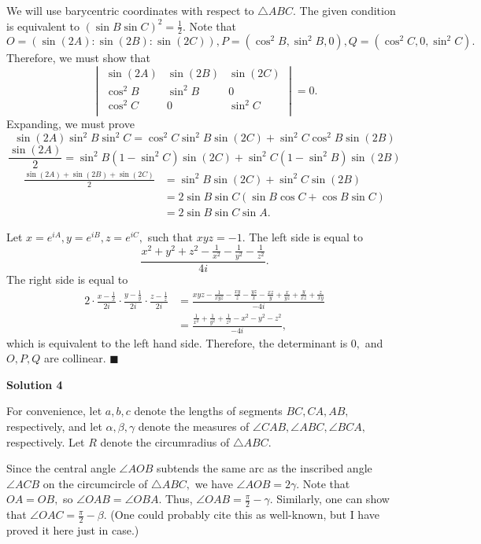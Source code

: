 \begin{enumerate}
We will use barycentric coordinates with respect to $\triangle ABC.$ The given condition is equivalent to $(\sin B\sin C)^2=\frac{1}{2}.$ Note that 
 \[O=(\sin(2A):\sin(2B):\sin(2C)), P=(\cos^2B,\sin^2B,0), Q=(\cos^2C,0,\sin^2C).\] Therefore, we must show that 
 \[\begin{vmatrix} \sin(2A) & \sin(2B) & \sin(2C) \\  \cos^2B & \sin^2B & 0 \\  \cos^2C & 0 & \sin^2C \\  \end{vmatrix}=0.\] Expanding, we must prove 
 \[\sin(2A)\sin^2B\sin^2C=\cos^2C\sin^2B\sin(2C)+\sin^2C\cos^2B\sin(2B)\] 
 \[\frac{\sin(2A)}{2}=\sin^2B(1-\sin^2C)\sin(2C)+\sin^2C(1-\sin^2B)\sin(2B)\] 
 \begin{align*} \frac{\sin(2A)+\sin(2B)+\sin(2C)}{2}&=\sin^2B\sin(2C)+\sin^2C\sin(2B)\\ &=2\sin B\sin C(\sin B\cos C+\cos B\sin C) \\ &=2\sin B\sin C\sin A.\end{align*}


 Let $x=e^{iA}, y=e^{iB}, z=e^{iC},$ such that $xyz=-1.$ The left side is equal to 
 \[\frac{x^2+y^2+z^2-\frac{1}{x^2}-\frac{1}{y^2}-\frac{1}{z^2}}{4i}.\] The right side is equal to 
 \begin{align*} 2\cdot \frac{x-\frac{1}{x}}{2i}\cdot \frac{y-\frac{1}{y}}{2i}\cdot \frac{z-\frac{1}{z}}{2i}&=\frac{xyz-\frac{1}{xyz}-\frac{xy}{z}-\frac{yz}{x}-\frac{xz}{y}+\frac{x}{yz}+\frac{y}{xz}+\frac{z}{xy}}{-4i}\\ &=\frac{\frac{1}{x^2}+\frac{1}{y^2}+\frac{1}{z^2}-x^2-y^2-z^2}{-4i},\end{align*}
 which is equivalent to the left hand side. Therefore, the determinant is $0,$ and $O,P,Q$ are collinear. $\blacksquare$




\textbf{Solution 4}

For convenience, let $a, b, c$ denote the lengths of segments $BC, CA, AB,$ respectively, and let $\alpha, \beta, \gamma$ denote the measures of $\angle CAB, \angle ABC, \angle BCA,$ respectively. Let $R$ denote the circumradius of $\triangle ABC.$

 Since the central angle $\angle AOB$ subtends the same arc as the inscribed angle $\angle ACB$ on the circumcircle of $\triangle ABC,$ we have $\angle AOB = 2\gamma.$ Note that $OA = OB,$ so $\angle OAB = \angle OBA.$ Thus, $\angle OAB = \frac{\pi}{2} - \gamma.$ Similarly, one can show that $\angle OAC = \frac{\pi}{2} - \beta.$ (One could probably cite this as well-known, but I have proved it here just in case.)


\end{enumerate}
